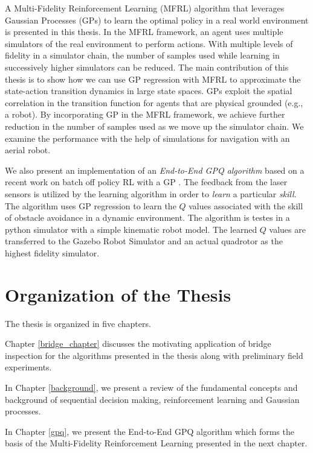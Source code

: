 \documentclass[12pt]{report}
\begin{document}
A Multi-Fidelity Reinforcement Learning (MFRL) algorithm that leverages Gaussian Processes (GPs) to learn the optimal policy in a real world environment is presented in this thesis. In the MFRL framework, an agent uses multiple simulators of the real environment to perform actions. With multiple levels of fidelity in a simulator chain, the number of samples used while learning in successively higher simulators can be reduced. The main contribution of this thesis is to show how we can use GP regression with MFRL to approximate the state-action transition dynamics in large state spaces. GPs exploit the spatial correlation in the transition function for agents that are physical grounded (e.g., a robot). By incorporating GP in the MFRL framework, we achieve further reduction in the number of samples used as we move up the simulator chain. We examine the performance with the help of simulations for navigation with an aerial robot.\par 
We also present an implementation of an \textit{End-to-End GPQ algorithm} based on a recent work on batch off policy RL with a GP \cite{chowdhary2014off}. The feedback from the laser sensors is utilized by the learning algorithm in order to \textit{learn} a particular \textit{skill}. The algorithm uses GP regression to learn the $Q$ values associated with the skill of obstacle avoidance in a dynamic environment. The algorithm is testes in a python simulator with a simple kinematic robot model. The learned $Q$ values are transferred to the Gazebo Robot Simulator and an actual quadrotor as the highest fidelity simulator.


\section{Organization of the Thesis}

The thesis is organized in five chapters.\par

Chapter \ref{bridge_chapter} discusses the motivating application of bridge inspection for the algorithms presented in the thesis along with preliminary field experiments.\par

In Chapter \ref{background}, we present a review of the fundamental concepts and background of sequential decision making, reinforcement learning and Gaussian processes.\par 

In Chapter \ref{gpq}, we present the End-to-End GPQ algorithm which forms the basis of the Multi-Fidelity Reinforcement Learning presented in the next chapter.\par
\end{document}
